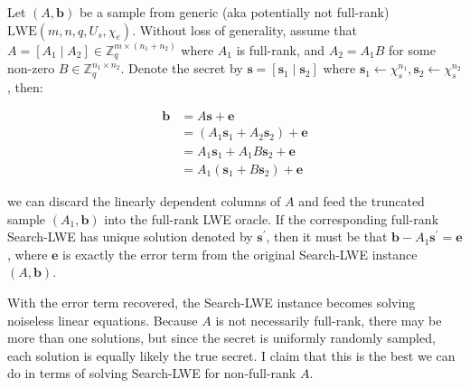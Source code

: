\documentclass{article}
\begin{document}
Let $(A, \mathbf{b})$ be a sample from generic (aka potentially not full-rank) $\text{LWE}(m, n, q, U_s, \chi_e)$. Without loss of generality, assume that $A = [A_1 \mid A_2] \in \mathbb{Z}_q^{m \times (n_1 + n_2)}$ where $A_1$ is full-rank, and $A_2 = A_1B$ for some non-zero $B \in \mathbb{Z}_q^{n_1 \times n_2}$. Denote the secret by $\mathbf{s} = [\mathbf{s}_1 \mid \mathbf{s}_2]$ where $\mathbf{s}_1 \leftarrow \chi_s^{n_1}, \mathbf{s}_2 \leftarrow \chi_s^{n_2}$, then:

$$
\begin{aligned}
\mathbf{b} &= A\mathbf{s} + \mathbf{e} \\
&= (A_1\mathbf{s}_1 + A_2\mathbf{s}_2) + \mathbf{e} \\
&= A_1\mathbf{s}_1 + A_1B\mathbf{s}_2 + \mathbf{e} \\
&= A_1(\mathbf{s}_1 + B\mathbf{s}_2) + \mathbf{e}
\end{aligned}
$$

we can discard the linearly dependent columns of $A$ and feed the truncated sample $(A_1, \mathbf{b})$ into the full-rank LWE oracle. If the corresponding full-rank Search-LWE has unique solution denoted by $\mathbf{s}^\prime$, then it must be that $\mathbf{b} - A_1\mathbf{s}^\prime = \mathbf{e}$, where $\mathbf{e}$ is exactly the error term from the original Search-LWE instance $(A, \mathbf{b})$.

With the error term recovered, the Search-LWE instance becomes solving noiseless linear equations. Because $A$ is not necessarily full-rank, there may be more than one solutions, but since the secret is uniformly randomly sampled, each solution is equally likely the true secret. I claim that this is the best we can do in terms of solving Search-LWE for non-full-rank $A$.
\end{document}
